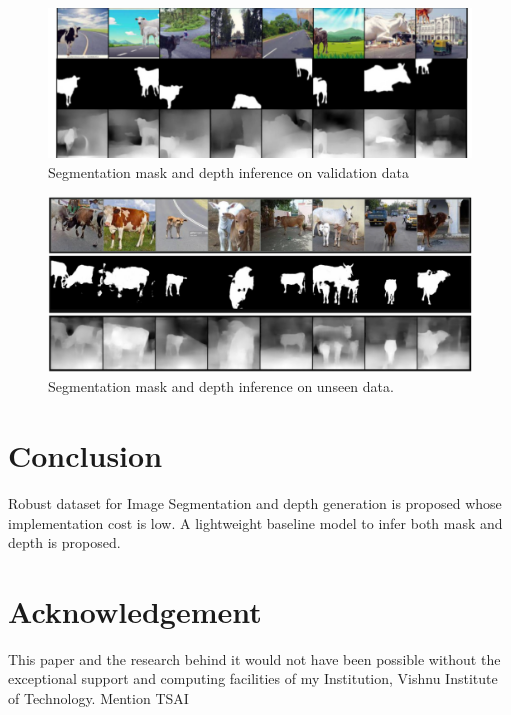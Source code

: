 \documentclass[review]{cvpr}
\begin{document}
\begin{figure}
  \begin{center}
    \includegraphics[width=1\textwidth]{validinference.png}
  \end{center}
  \caption{Segmentation mask and depth inference on validation data}
  \label{fig:validinfer}
\end{figure}


\begin{figure}
  \begin{center}
    \includegraphics[width=1\textwidth]{unseeninference.png}
  \end{center}
  \caption{Segmentation mask and depth inference on unseen data.}
  \label{fig:unseeninfer}
\end{figure}



\section{Conclusion}
Robust dataset for Image Segmentation and depth generation is proposed whose implementation cost is low.
A lightweight baseline model to infer both mask and depth is proposed.
\section{Acknowledgement}
This paper and the research behind it would not have been possible without the exceptional support and computing facilities of my Institution, Vishnu Institute of Technology. Mention TSAI

{\small


}
\end{document}

